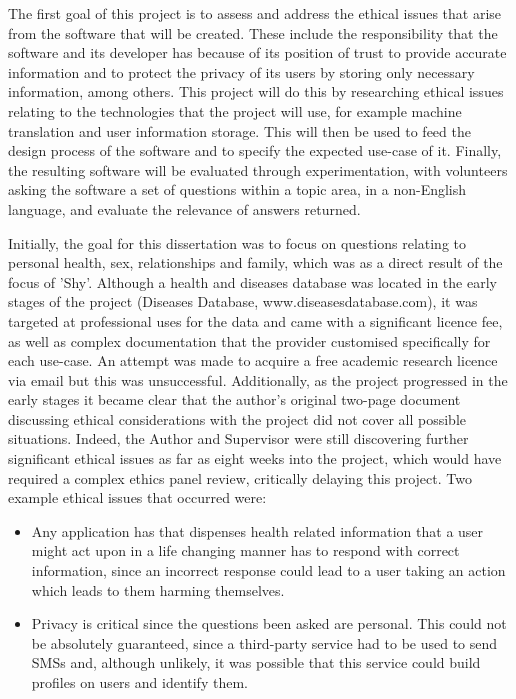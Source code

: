 \documentclass[authoryearcitations]{UoYCSproject}
\begin{document}
The first goal of this project is to assess and address the ethical issues that arise from the software that will be created.  These include the responsibility that the software and its developer has because of its position of trust to provide accurate information and to protect the privacy of its users by storing only necessary information, among others.  This project will do this by researching ethical issues relating to the technologies that the project will use, for example machine translation and user information storage.  This will then be used to feed the design process of the software and to specify the expected use-case of it.  Finally, the resulting software will be evaluated through experimentation, with volunteers asking the software a set of questions within a topic area, in a non-English language, and evaluate the relevance of answers returned.

Initially, the goal for this dissertation was to focus on questions relating to personal health, sex, relationships and family, which was as a direct result of the focus of 'Shy'.  Although a health and diseases database was located in the early stages of the project (Diseases Database, www.diseasesdatabase.com), it was targeted at professional uses for the data and came with a significant licence fee, as well as complex documentation that the provider customised specifically for each use-case.  An attempt was made to acquire a free academic research licence via email but this was unsuccessful.  Additionally, as the project progressed in the early stages it became clear that the author's original two-page document discussing ethical considerations with the project did not cover all possible situations.  Indeed, the Author and Supervisor were still discovering further significant ethical issues as far as eight weeks into the project, which would have required a complex ethics panel review, critically delaying this project.  Two example ethical issues that occurred were:

\begin{itemize}
  \item Any application has that dispenses health related information that a user might act upon in a life changing manner has to respond with correct information, since an incorrect response could lead to a user taking an action which leads to them harming themselves.
  \item Privacy is critical since the questions been asked are personal.  This could not be absolutely guaranteed, since a third-party service had to be used to send SMSs and, although unlikely, it was possible that this service could build profiles on users and identify them.
\end{itemize}
\end{document}
